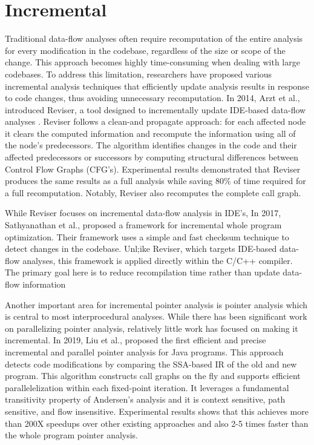\section{Incremental}

Traditional data-flow analyses often require recomputation of the entire analysis for every modification in the codebase, regardless of the size or scope of the change.
This approach becomes highly time-consuming when dealing with large codebases.
To address this limitation, researchers have proposed various incremental analysis techniques that efficiently update analysis results in response to code changes, thus avoiding unnecessary recomputation.
In 2014, Arzt et al., introduced Reviser, a tool designed to incrementally update IDE-based data-flow analyses \cite{arzt2014reviser}.
Reviser follows a clean-and propagate approach: for each affected node it clears the computed information and recompute the information using all of the node's predecessors.
The algorithm identifies changes in the code and their affected predecessors or successors by computing structural differences between Control Flow Graphs (CFG's).
Experimental results demonstrated that Reviser produces the same results as a full analysis while saving 80\% of time required for a full recomputation.
Notably, Reviser also recomputes the complete call graph.

While Reviser focuses on incremental data-flow analysis in IDE's, In 2017, Sathyanathan et al., \cite{sathyanathan2017incremental} proposed a framework for incremental whole program optimization.
Their framework uses a simple and fast checksum technique to detect changes in the codebase.
Unl;ike Reviser, which targets IDE-based data-flow analyses, this framework is applied directly within the C/C++ compiler.
The primary goal here is to reduce recompilation time rather than update data-flow information


Another important area for incremental pointer analysis is pointer analysis which is central to most interprocedural analyses.
While there has been significant work on parallelizing pointer analysis, relatively little work has focused on making it incremental. 
In 2019, Liu et al., \cite{liu2019rethinking} proposed the first efficient and precise incremental and parallel pointer analysis for Java programs.
This approach detects code modifications by comparing the SSA-based IR of the old and new program.
This algorithm constructs call graphs on the fly and supports efficient parallelelization within each fixed-point iteration.
It leverages a fundamental transitivity property of Andersen's analysis and it is context sensitive, path sensitive, and flow insensitive.
Experimental results shows that this achieves more than 200X speedups over other existing approaches and also 2-5 times faster than the whole program pointer analysis.

